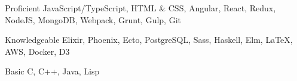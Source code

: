 

\begin{cvskills}

  \cvskill
    {Proficient} %
    {JavaScript/TypeScript, HTML \& CSS, Angular, React, Redux, NodeJS, MongoDB, Webpack, Grunt, Gulp, Git} %

  \cvskill
    {Knowledgeable} %
    {Elixir, Phoenix, Ecto, PostgreSQL, Sass, Haskell, Elm, LaTeX, AWS, Docker, D3} %

  \cvskill
    {Basic} %
    {C, C++, Java, Lisp} %

\end{cvskills}
